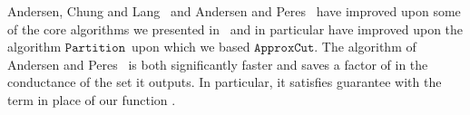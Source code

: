 \documentclass[11pt]{article}
\newcommand{\approxcut}{\ensuremath{\mathtt{ApproxCut}}}
\newcommand{\partition}{\ensuremath{\mathtt{Partition}}}
\begin{document}
Andersen, Chung and Lang~\cite{AndersenChungLang} 
  and Andersen and Peres~\cite{AndersenPeres} have
  improved upon some of the core algorithms we presented in~\cite{SpielmanTengCuts}
  and in particular have improved upon the algorithm \partition \ upon which
  we based \approxcut.
The algorithm of Andersen and Peres~\cite{AndersenPeres} is both significantly
  faster and saves a factor of  in the conductance of the set it
  outputs.
In particular, it satisfies guarantee  with the term
   in place of our function .




\end{document}
